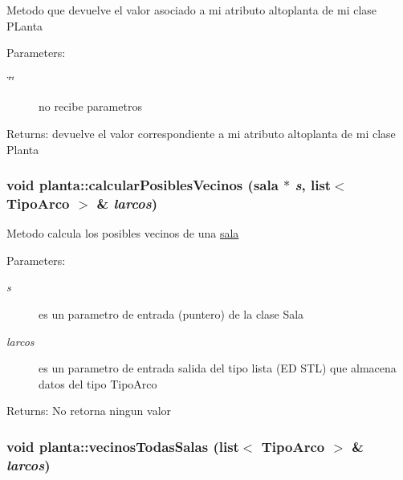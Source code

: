Metodo que devuelve el valor asociado a mi atributo altoplanta de mi clase PLanta \begin{Desc}
\item[Parameters:]
\begin{description}
\item[{\em \char`\"{}\char`\"{}}]no recibe parametros \end{description}
\end{Desc}
\begin{Desc}
\item[Returns:]devuelve el valor correspondiente a mi atributo altoplanta de mi clase Planta \end{Desc}
\hypertarget{classplanta_dd824feb63f74fa79c07b35292b6164d}{
\subsubsection[calcularPosiblesVecinos]{\setlength{\rightskip}{0pt plus 5cm}void planta::calcularPosiblesVecinos ({\bf sala} $\ast$ {\em s}, \/  list$<$ TipoArco $>$ \& {\em larcos})}}
\label{classplanta_dd824feb63f74fa79c07b35292b6164d}


Metodo calcula los posibles vecinos de una \hyperlink{classsala}{sala} \begin{Desc}
\item[Parameters:]
\begin{description}
\item[{\em s}]es un parametro de entrada (puntero) de la clase Sala \item[{\em larcos}]es un parametro de entrada salida del tipo lista (ED STL) que almacena datos del tipo TipoArco \end{description}
\end{Desc}
\begin{Desc}
\item[Returns:]No retorna ningun valor \end{Desc}
\hypertarget{classplanta_8f751a6905970cdc9922b9662b33f24c}{
\subsubsection[vecinosTodasSalas]{\setlength{\rightskip}{0pt plus 5cm}void planta::vecinosTodasSalas (list$<$ TipoArco $>$ \& {\em larcos})}}
\label{classplanta_8f751a6905970cdc9922b9662b33f24c}


